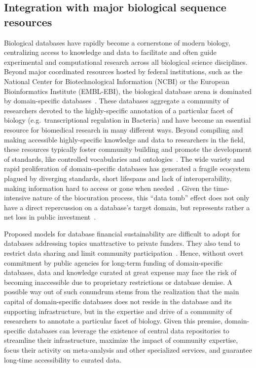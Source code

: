 \subsection{Integration with major biological sequence resources}

Biological databases have rapidly become a cornerstone of modern biology,
centralizing access to knowledge and data to facilitate and often guide
experimental and computational research across all biological science
disciplines. Beyond major coordinated resources hosted by federal institutions,
such as the National Center for Biotechnological Information (NCBI) or the
European Bioinformatics Institute (EMBL-EBI), the biological database arena is
dominated by domain-specific databases~\citep{chen2007online,
  chandras2009models, bolser2012metabase, galperin20152015}. These databases
aggregate a community of researchers devoted to the highly-specific annotation
of a particular facet of biology (e.g.\ transcriptional regulation in Bacteria)
and have become an essential resource for biomedical research in many different
ways. Beyond compiling and making accessible highly-specific knowledge and data
to researchers in the field, these resources typically foster community
building and promote the development of standards, like controlled vocabularies
and ontologies~\citep{howe2008big, dunin2006modomics, schindelman2011worm,
  costa2013drosophila}. The wide variety and rapid proliferation of
domain-specific databases has generated a fragile ecosystem plagued by
diverging standards, short lifespans and lack of interoperability, making
information hard to access or gone when needed~\citep{wren2008databases}. Given
the time-intensive nature of the biocuration process, this “data tomb” effect
does not only have a direct repercussion on a database’s target domain, but
represents rather a net loss in public investment~\citep{merali2005databases,
  howe2008big, bastow2010sustainable}.

Proposed models for database financial sustainability are difficult to adopt
for databases addressing topics unattractive to private funders. They also tend
to restrict data sharing and limit community
participation~\citep{chandras2009models, bastow2010sustainable}. Hence, without
overt commitment by public agencies for long-term funding of domain-specific
databases, data and knowledge curated at great expense may face the risk of
becoming inaccessible due to proprietary restrictions or database demise. A
possible way out of such conundrum stems from the realization that the main
capital of domain-specific databases does not reside in the database and its
supporting infrastructure, but in the expertise and drive of a community of
researchers to annotate a particular facet of biology. Given this premise,
domain-specific databases can leverage the existence of central data
repositories to streamline their infrastructure, maximize the impact of
community expertise, focus their activity on meta-analysis and other
specialized services, and guarantee long-time accessibility to curated data.

